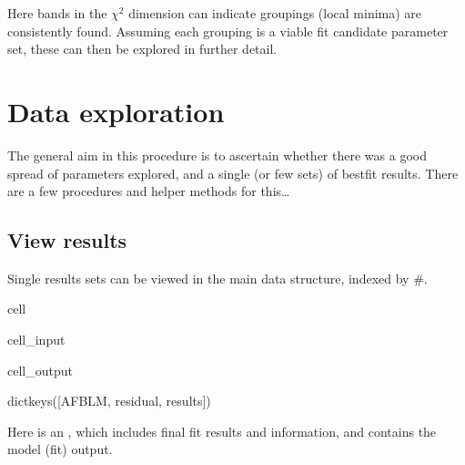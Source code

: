 \documentclass[letterpaper,table,10pt,english]{jupyterBook}
\begin{document}
\sphinxAtStartPar
Here bands in the \(\chi^2\) dimension can indicate groupings (local minima) are consistently found. Assuming each grouping is a viable fit candidate parameter set, these can then be explored in further detail.


\section{Data exploration}
\label{\detokenize{part2/case-study-OCS_290723:data-exploration}}
\sphinxAtStartPar
The general aim in this procedure is to ascertain whether there was a good spread of parameters explored, and a single (or few sets) of best\sphinxhyphen{}fit results. There are a few procedures and helper methods for this…


\subsection{View results}
\label{\detokenize{part2/case-study-OCS_290723:view-results}}
\sphinxAtStartPar
Single results sets can be viewed in the main data structure, indexed by \#.

\begin{sphinxuseclass}{cell}\begin{sphinxVerbatimInput}

\begin{sphinxuseclass}{cell_input}
\begin{sphinxVerbatim}[commandchars=\\\{\}]
  
\PYG{p}{[}\PYG{p}{]}
\end{sphinxVerbatim}

\end{sphinxuseclass}\end{sphinxVerbatimInput}
\begin{sphinxVerbatimOutput}

\begin{sphinxuseclass}{cell_output}
\begin{sphinxVerbatim}[commandchars=\\\{\}]
dict\PYGZus{}keys([\PYGZsq{}AFBLM\PYGZsq{}, \PYGZsq{}residual\PYGZsq{}, \PYGZsq{}results\PYGZsq{}])
\end{sphinxVerbatim}

\end{sphinxuseclass}\end{sphinxVerbatimOutput}

\end{sphinxuseclass}
\sphinxAtStartPar
Here  is an , which includes final fit results and information, and  contains the model (fit) output.
\end{document}
